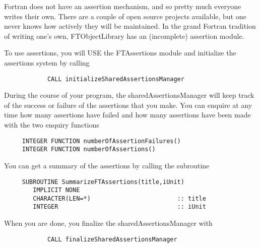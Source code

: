 \documentclass[9pt]{article}
\begin{document}
Fortran does not have an assertion mechanism, and so pretty much everyone writes their own. 
There are a couple of open source projects available, but one never knows how actively they will be 
maintained. In the grand Fortran tradition of writing one's own, FTObjectLibrary has
an (incomplete) assertion module. 

To use assertions, you will USE the FTAssertions module and initialize the assertions system by calling
	{\color{blue}\begin{verbatim}
        	CALL initializeSharedAssertionsManager
	\end{verbatim}}
During the course of your program, the sharedAssertionsManager will keep track of the 
success or failure of the assertions that you make. You can enquire at any time how many assertions
have failed and how many assertions have been made with the two enquiry functions
	{\color{blue}\begin{verbatim}
     INTEGER FUNCTION numberOfAssertionFailures()
     INTEGER FUNCTION numberOfAssertions()
	\end{verbatim}}
You can get a summary of the assertions by calling the subroutine
	{\color{blue}\begin{verbatim}
     SUBROUTINE SummarizeFTAssertions(title,iUnit)  
        IMPLICIT NONE
        CHARACTER(LEN=*)                        :: title
        INTEGER                                 :: iUnit
	\end{verbatim}}
When you are done, you finalize the sharedAssertionsManager with
	{\color{blue}\begin{verbatim}
        	CALL finalizeSharedAssertionsManager
	\end{verbatim}}
\end{document}
